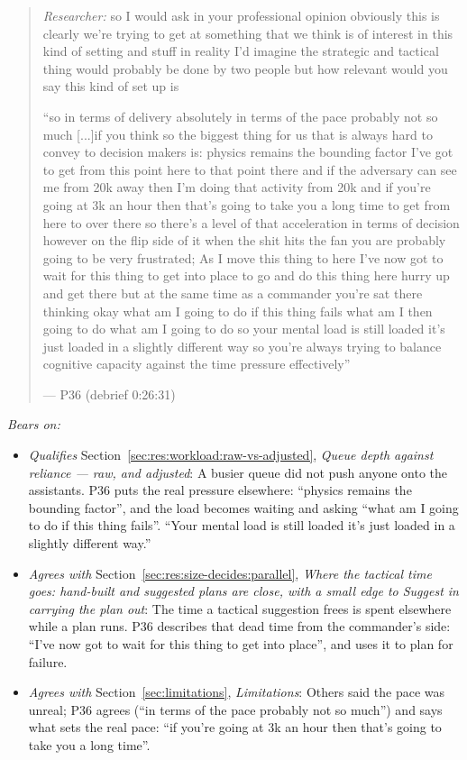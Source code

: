 \begin{quote}\small
{\footnotesize\textit{Researcher:} so I would ask in your professional opinion obviously this is clearly we're trying to get at something that we think is of interest in this kind of setting and stuff in reality I'd imagine the strategic and tactical thing would probably be done by two people but how relevant would you say this kind of set up is}\par\smallskip
``so in terms of delivery absolutely in terms of the pace probably not so much [...]if you think so the biggest thing for us that is always hard to convey to decision makers is: physics remains the bounding factor I've got to get from this point here to that point there and if the adversary can see me from 20k away then I'm doing that activity from 20k and if you're going at 3k an hour then that's going to take you a long time to get from here to over there so there's a level of that acceleration in terms of decision however on the flip side of it when the shit hits the fan you are probably going to be very frustrated; As I move this thing to here I've now got to wait for this thing to get into place to go and do this thing here hurry up and get there but at the same time as a commander you're sat there thinking okay what am I going to do if this thing fails what am I then going to do what am I going to do so your mental load is still loaded it's just loaded in a slightly different way so you're always trying to balance cognitive capacity against the time pressure effectively''\par\hfill--- P36 (debrief 0:26:31)
\end{quote}

\noindent\textit{Bears on:}
\begin{itemize}[leftmargin=1.2em,itemsep=1pt]\small
\item \textit{Qualifies} Section~\ref{sec:res:workload:raw-vs-adjusted}, \emph{Queue depth against reliance --- raw, and adjusted}: A busier queue did not push anyone onto the assistants. P36 puts the real pressure elsewhere: ``physics remains the bounding factor'', and the load becomes waiting and asking ``what am I going to do if this thing fails''. ``Your mental load is still loaded it's just loaded in a slightly different way.''
\item \textit{Agrees with} Section~\ref{sec:res:size-decides:parallel}, \emph{Where the tactical time goes: hand-built and suggested plans are close, with a small edge to Suggest in carrying the plan out}: The time a tactical suggestion frees is spent elsewhere while a plan runs. P36 describes that dead time from the commander's side: ``I've now got to wait for this thing to get into place'', and uses it to plan for failure.
\item \textit{Agrees with} Section~\ref{sec:limitations}, \emph{Limitations}: Others said the pace was unreal; P36 agrees (``in terms of the pace probably not so much'') and says what sets the real pace: ``if you're going at 3k an hour then that's going to take you a long time''.
\end{itemize}

